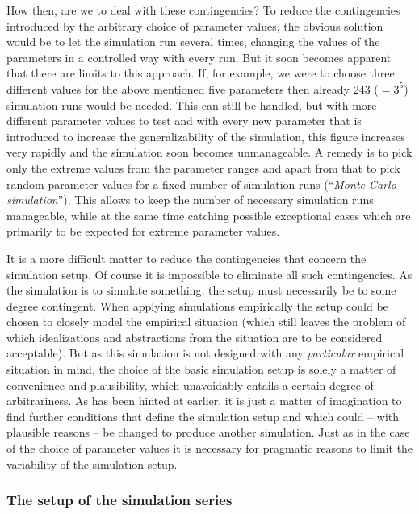 How then, are we to deal with these contingencies? To reduce the contingencies
introduced by the arbitrary choice of parameter values, the obvious solution
would be to let the simulation run several times, changing the values of the
parameters in a controlled way with every run. But it soon becomes apparent
that there are limits to this approach. If, for example, we were to choose
three different values for the above mentioned five parameters then already 243
($=3^5$) simulation runs would be needed. This can still be handled, but with
more different parameter values to test and with every new parameter that is
introduced to increase the generalizability of the simulation, this figure
increases very rapidly and the simulation soon becomes unmanageable. A remedy
is to pick only the extreme values from the parameter ranges and apart from
that to pick random parameter values for a fixed number of simulation runs
(``{\em Monte Carlo simulation}''). This allows to keep the number of
necessary simulation runs manageable, while at the same time catching possible
exceptional cases which are primarily to be expected for extreme parameter
values.

It is a more difficult matter to reduce the contingencies that concern the
simulation setup.  Of course it is impossible to eliminate all such
contingencies. As the simulation is to simulate something, the setup
must necessarily be to some degree contingent. When applying simulations
empirically the setup could be chosen to closely model the empirical situation
(which still leaves the problem of which idealizations and abstractions from
the situation are to be considered acceptable). But as this simulation is not
designed with any {\em particular} empirical situation in mind, the choice of
the basic simulation setup is solely a matter of convenience and plausibility,
which unavoidably entails a certain degree of arbitrariness. As has been
hinted at earlier, it is just a matter of imagination to find further
conditions that define the simulation setup and which could -- with plausible
reasons -- be changed to produce another simulation. Just as in the case of
the choice of parameter values it is necessary for pragmatic reasons to limit
the variability of the simulation setup.

\subsubsection{The setup of the simulation series}

